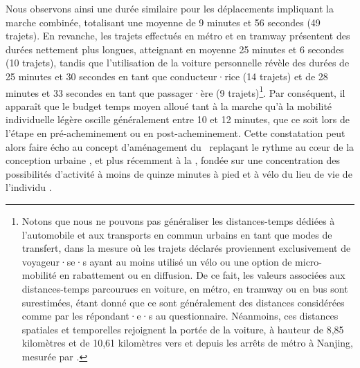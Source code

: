 \begin{refsegment}
Nous observons ainsi une durée similaire pour les déplacements impliquant la marche combinée, totalisant une moyenne de 9 minutes et 56 secondes (49 trajets). En revanche, les trajets effectués en métro et en tramway présentent des durées nettement plus longues, atteignant en moyenne 25 minutes et 6 secondes (10 trajets), tandis que l'utilisation de la voiture personnelle révèle des durées de 25 minutes et 30 secondes en tant que conducteur·rice (14 trajets) et de 28 minutes et 33 secondes en tant que passager·ère (9 trajets)\footnote{
    Notons que nous ne pouvons pas généraliser les distances-temps dédiées à l'automobile et aux transports en commun urbains en tant que modes de transfert, dans la mesure où les trajets déclarés proviennent exclusivement de voyageur·se·s ayant au moins utilisé un vélo ou une option de micro-mobilité en rabattement ou en diffusion. De ce fait, les valeurs associées aux distances-temps parcourues en voiture, en métro, en tramway ou en bus sont surestimées, étant donné que ce sont généralement des distances considérées comme  par les répondant·e·s au questionnaire. Néanmoins, ces distances spatiales et temporelles rejoignent la portée de la voiture, à hauteur de 8,85 kilomètres et de 10,61 kilomètres vers et depuis les arrêts de métro à Nanjing, mesurée par \textcolor{blue}{\textcite[9]{li_measuring_2022}}.
}. Par conséquent, il apparaît que le budget temps moyen alloué tant à la marche qu'à la mobilité individuelle légère oscille généralement entre 10 et 12 minutes, que ce soit lors de l'étape en pré-acheminement ou en post-acheminement. Cette constatation peut alors faire écho au concept d'aménagement du ~replaçant le rythme au cœur de la conception urbaine \textcolor{blue}{\autocite[120]{ascher_du_1997}}, et plus récemment à la , fondée sur une concentration des possibilités d'activité à moins de quinze minutes à pied et à vélo du lieu de vie de l'individu \textcolor{blue}{\autocite[126]{moreno_droit_2020}}.%


\end{refsegment}
